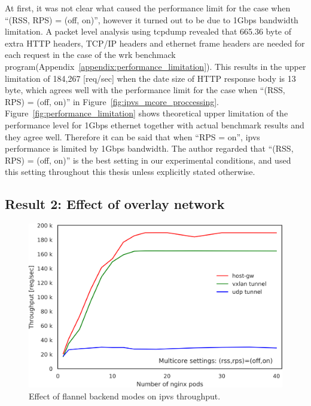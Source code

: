 At first, it was not clear what caused the performance limit for the case when \enquote{(RSS, RPS) = (off, on)},
however it turned out to be due to 1Gbps bandwidth limitation.
A packet level analysis using tcpdump\cite{jacobson1989tcpdump} revealed that 665.36 byte of extra HTTP headers, 
TCP/IP headers and ethernet frame headers are needed for each request in the case of the wrk benchmack program(Appendix~\ref{appendix:performance_limitation}). 
This results in the upper limitation of 184,267 [req/sec] when the date size of HTTP response body is 13 byte, which agrees well with the performance limit for the case when \enquote{(RSS, RPS) = (off, on)} in Figure~\ref{fig:ipvs_mcore_proccessing}. 
Figure~\ref{fig:performance_limitation} shows theoretical upper limitation of the performance level for 1Gbps ethernet together with actual benchmark results and they agree well.
Therefore it can be said that when \enquote{RPS = on}, ipvs performance is limited by 1Gbps bandwidth.
The author regarded that \enquote{(RSS, RPS) = (off, on)} is the best setting in our experimental conditions, and used this setting throughout this thesis unless explicitly stated otherwise.

\FloatBarrier

\subsection{Result 2: Effect of overlay network}

\begin{figure}[h]
  \centering
  \includegraphics[width=0.8\columnwidth]{Figs/ipvs_flannel_mode}
  \caption{Effect of flannel backend modes on ipvs throughput.}
  \label{fig:ipvs_flannel_mode}
\end{figure}

